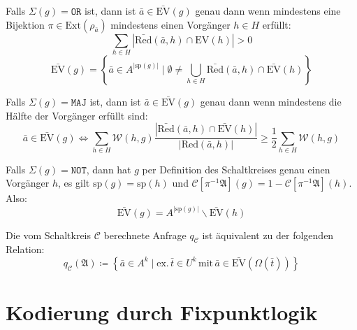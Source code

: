 \begin{casenv}
\[\]
\item Falls $\Sigma\left(g\right)=\mathtt{OR}$ ist, dann ist $\bar{a}\in\bar{\mathrm{EV}}\left(g\right)$
genau dann wenn mindestens eine Bijektion $\pi\in\mathrm{Ext}\left(\rho_{\bar{a}}\right)$
mindestens einen Vorgänger $h\in H$ erfüllt:
\[
\sum_{h\in H}\left|\bar{\mathrm{Red}}\left(\bar{a},h\right)\cap\mathrm{EV}\left(h\right)\right|>0
\]
\[
\bar{\mathrm{EV}}\left(g\right)=\left\{ \bar{a}\in A^{\left|\mathrm{sp}\left(g\right)\right|}\mid\emptyset\neq\bigcup_{h\in H}\bar{\mathrm{Red}}\left(\bar{a},h\right)\cap\bar{\mathrm{EV}}\left(h\right)\right\} 
\]
\item Falls $\Sigma\left(g\right)=\mathtt{MAJ}$ ist, dann ist $\bar{a}\in\bar{\mathrm{EV}}\left(g\right)$
genau dann wenn mindestens die Hälfte der Vorgänger erfüllt sind:
\[
\bar{a}\in\bar{\mathrm{EV}}\left(g\right)\Leftrightarrow\sum_{h\in H}\mathcal{W}\left(h,g\right)\frac{\left|\bar{\mathrm{Red}}\left(\bar{a},h\right)\cap\bar{\mathrm{EV}}\left(h\right)\right|}{\left|\mathrm{Red}\left(\bar{a},h\right)\right|}\geqslant\frac{1}{2}\sum_{h\in H}\mathcal{W}\left(h,g\right)
\]
\item Falls $\Sigma\left(g\right)=\mathtt{NOT}$, dann hat $g$ per Definition
des Schaltkreises genau einen Vorgänger $h$, es gilt $\mathrm{sp}\left(g\right)=\mathrm{sp}\left(h\right)$
und $\mathcal{C}\left[\pi^{-1}\mathfrak{A}\right]\left(g\right)=1-\mathcal{C}\left[\pi^{-1}\mathfrak{A}\right]\left(h\right)$.
Also:
\[
\bar{\mathrm{EV}}\left(g\right)=A^{\left|\mathrm{sp}\left(g\right)\right|}\backslash\bar{\mathrm{EV}}\left(h\right)
\]
\end{casenv}
Die vom Schaltkreis $\mathcal{C}$ berechnete Anfrage $q_{\mathcal{C}}$
ist äquivalent zu der folgenden Relation:
\[
q_{\mathcal{C}}\left(\mathfrak{A}\right)\coloneqq\left\{ \bar{a}\in A^{k}\mid\mathrm{ex.}\,\bar{t}\in U^{k}\,\mathrm{mit}\,\bar{a}\in\bar{\mathrm{EV}}\left(\Omega\left(\bar{t}\right)\right)\right\} 
\]


\section{Kodierung durch Fixpunktlogik}

